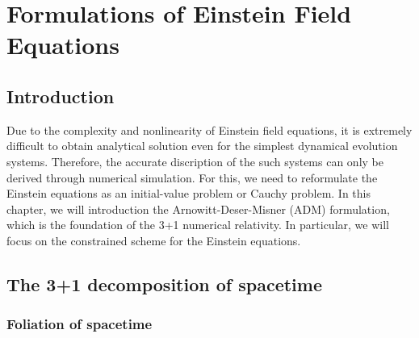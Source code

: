
\chapter{Formulations of Einstein Field Equations}  %

\ifpdf
    \graphicspath{{Chapter2/Figs/PDF/}{Chapter2/Figs/}}
\else
    \graphicspath{{Chapter2/Figs/}}
\fi


\section{Introduction} %
\label{section2.1}

Due to the complexity and nonlinearity of Einstein field equations, it is extremely difficult to obtain analytical solution even for the simplest dynamical evolution systems.
Therefore, the accurate discription of the such systems can only be derived through numerical simulation.
For this, we need to reformulate the Einstein equations as an initial-value problem or Cauchy problem.
In this chapter, we will introduction the Arnowitt-Deser-Misner (ADM) formulation, which is the foundation of the 3+1 numerical relativity.
In particular, we will focus on the constrained scheme for the Einstein equations.

\section{The 3+1 decomposition of spacetime} %
\label{section2.2}
\subsection{Foliation of spacetime} \label{section2.2.1}

